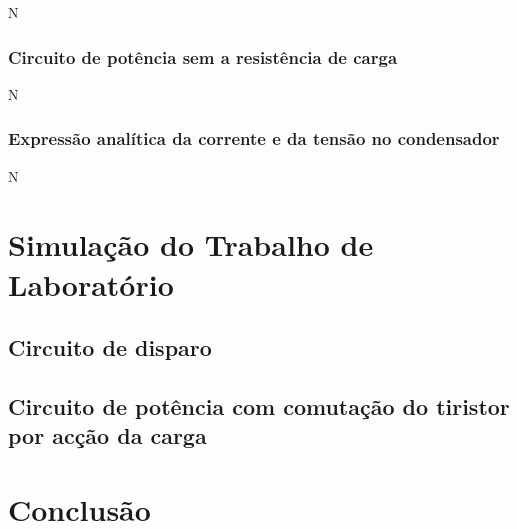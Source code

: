 \documentclass[a4paper,11pt]{article}
\numberwithin{equation}{section}
\begin{document}
N

\subsubsection{Circuito de potência sem a resistência de carga}

N

\subsubsection{Expressão analítica da corrente e da tensão no condensador}

N

\pagebreak

\section{Simulação do Trabalho de Laboratório}

\subsection{Circuito de disparo}

\subsection{Circuito de potência com comutação do tiristor por acção da carga}

\pagebreak

\section{Conclusão}
\end{document}
